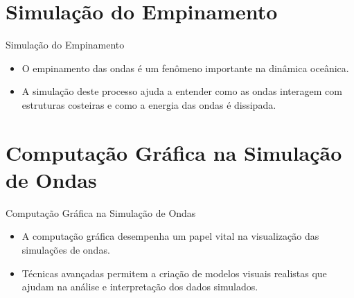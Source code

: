 \documentclass[aspectratio=169,xcolor=table]{beamer}
\begin{document}
\section{Simulação do Empinamento}
\begin{frame}{Simulação do Empinamento}
    \begin{itemize}
        \item O empinamento das ondas é um fenômeno importante na dinâmica oceânica.
        \item A simulação deste processo ajuda a entender como as ondas interagem com estruturas costeiras e como a energia das ondas é dissipada.
    \end{itemize}
\end{frame}

\section{Computação Gráfica na Simulação de Ondas}
\begin{frame}{Computação Gráfica na Simulação de Ondas}
    \begin{itemize}
        \item A computação gráfica desempenha um papel vital na visualização das simulações de ondas.
        \item Técnicas avançadas permitem a criação de modelos visuais realistas que ajudam na análise e interpretação dos dados simulados.
    \end{itemize}
\end{frame}
\end{document}
